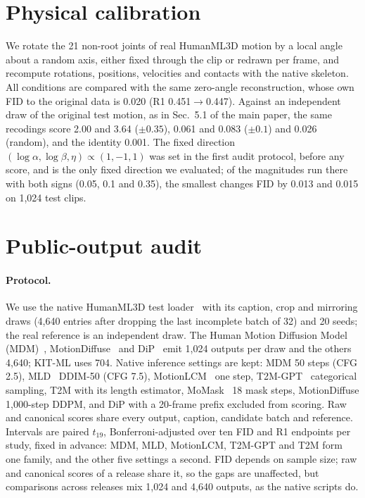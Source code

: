 \documentclass[10pt,twocolumn,letterpaper]{article}
\begin{document}
\section{Physical calibration}\label{sec:physical}
We rotate the 21 non-root joints of real HumanML3D motion by a local angle about a random axis, either fixed through the clip or redrawn per frame, and recompute rotations, positions, velocities and contacts with the native skeleton. All conditions are compared with the same zero-angle reconstruction, whose own FID to the original data is 0.020 (R1 0.451$\to$0.447). Against an independent draw of the original test motion, as in Sec.~5.1 of the main paper, the same recodings score 2.00 and 3.64 ($\pm0.35$), 0.061 and 0.083 ($\pm0.1$) and 0.026 (random), and the identity 0.001. The fixed direction $(\log\alpha,\log\beta,\eta)\propto(1,-1,1)$ was set in the first audit protocol, before any score, and is the only fixed direction we evaluated; of the magnitudes run there with both signs (0.05, 0.1 and 0.35), the smallest changes FID by 0.013 and 0.015 on 1,024 test clips.



\section{Public-output audit}\label{sec:natural}
\paragraph{Protocol.} We use the native HumanML3D test loader~\cite{guo2022} with its caption, crop and mirroring draws (4,640 entries after dropping the last incomplete batch of 32) and 20 seeds; the real reference is an independent draw. The Human Motion Diffusion Model (MDM)~\cite{tevet2023}, MotionDiffuse~\cite{motiondiffuse2024} and DiP~\cite{closd2025} emit 1,024 outputs per draw and the others 4,640; KIT-ML uses 704. Native inference settings are kept: MDM 50 steps (CFG 2.5), MLD~\cite{mld2023} DDIM-50 (CFG 7.5), MotionLCM~\cite{motionlcm2024} one step, T2M-GPT~\cite{t2mgpt2023} categorical sampling, T2M with its length estimator, MoMask~\cite{momask2024} 18 mask steps, MotionDiffuse 1,000-step DDPM, and DiP with a 20-frame prefix excluded from scoring. Raw and canonical scores share every output, caption, candidate batch and reference. Intervals are paired $t_{19}$, Bonferroni-adjusted over ten FID and R1 endpoints per study, fixed in advance: MDM, MLD, MotionLCM, T2M-GPT and T2M form one family, and the other five settings a second. FID depends on sample size; raw and canonical scores of a release share it, so the gaps are unaffected, but comparisons across releases mix 1,024 and 4,640 outputs, as the native scripts do.
\end{document}
